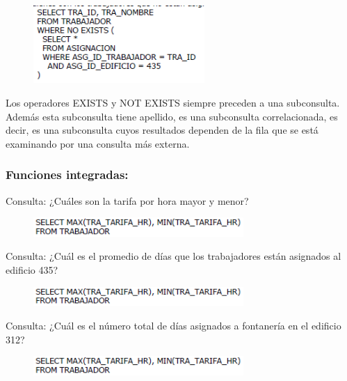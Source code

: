 \documentclass[preprint,12pt]{elsarticle}
\begin{document}
	\begin{figure}[htb]
		\begin{center}
			\includegraphics[width=6.5cm]{./IMAGENES/exists}
		\end{center}
	\end{figure}
Los operadores EXISTS y NOT EXISTS siempre preceden a una subconsulta.\\ Además esta subconsulta tiene apellido, es una subconsulta correlacionada, es decir, es una subconsulta cuyos resultados dependen de la fila que se está examinando por una consulta más externa.

\subsubsection{\textbf{Funciones integradas:}}
Consulta: ¿Cuáles son la tarifa por hora mayor y menor?

	\begin{figure}[htb]
		\begin{center}
			\includegraphics[width=8cm]{./IMAGENES/funintegrada1}
		\end{center}
	\end{figure}

Consulta: ¿Cuál es el promedio de días que los trabajadores están asignados al edificio
435?

	\begin{figure}[htb]
		\begin{center}
			\includegraphics[width=8cm]{./IMAGENES/funintegrada1}
		\end{center}
	\end{figure}

Consulta: ¿Cuál es el número total de días asignados a fontanería en el edificio 312?

	\begin{figure}[htb]
		\begin{center}
			\includegraphics[width=8cm]{./IMAGENES/funintegrada1}
		\end{center}
	\end{figure}
\end{document}
